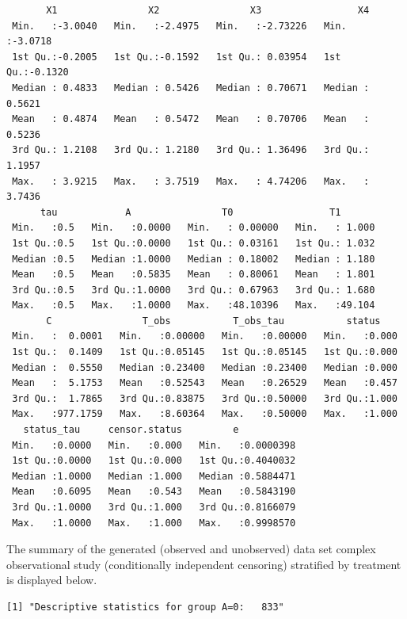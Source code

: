 \documentclass[
  11pt,
  a4paper,
]{article}
\theoremstyle{plain}
\theoremstyle{plain}
\theoremstyle{plain}
\theoremstyle{definition}
\theoremstyle{remark}
\begin{document}
\begin{verbatim}
       X1                X2                X3                 X4         
 Min.   :-3.0040   Min.   :-2.4975   Min.   :-2.73226   Min.   :-3.0718  
 1st Qu.:-0.2005   1st Qu.:-0.1592   1st Qu.: 0.03954   1st Qu.:-0.1320  
 Median : 0.4833   Median : 0.5426   Median : 0.70671   Median : 0.5621  
 Mean   : 0.4874   Mean   : 0.5472   Mean   : 0.70706   Mean   : 0.5236  
 3rd Qu.: 1.2108   3rd Qu.: 1.2180   3rd Qu.: 1.36496   3rd Qu.: 1.1957  
 Max.   : 3.9215   Max.   : 3.7519   Max.   : 4.74206   Max.   : 3.7436  
      tau            A                T0                 T1        
 Min.   :0.5   Min.   :0.0000   Min.   : 0.00000   Min.   : 1.000  
 1st Qu.:0.5   1st Qu.:0.0000   1st Qu.: 0.03161   1st Qu.: 1.032  
 Median :0.5   Median :1.0000   Median : 0.18002   Median : 1.180  
 Mean   :0.5   Mean   :0.5835   Mean   : 0.80061   Mean   : 1.801  
 3rd Qu.:0.5   3rd Qu.:1.0000   3rd Qu.: 0.67963   3rd Qu.: 1.680  
 Max.   :0.5   Max.   :1.0000   Max.   :48.10396   Max.   :49.104  
       C                T_obs           T_obs_tau           status     
 Min.   :  0.0001   Min.   :0.00000   Min.   :0.00000   Min.   :0.000  
 1st Qu.:  0.1409   1st Qu.:0.05145   1st Qu.:0.05145   1st Qu.:0.000  
 Median :  0.5550   Median :0.23400   Median :0.23400   Median :0.000  
 Mean   :  5.1753   Mean   :0.52543   Mean   :0.26529   Mean   :0.457  
 3rd Qu.:  1.7865   3rd Qu.:0.83875   3rd Qu.:0.50000   3rd Qu.:1.000  
 Max.   :977.1759   Max.   :8.60364   Max.   :0.50000   Max.   :1.000  
   status_tau     censor.status         e            
 Min.   :0.0000   Min.   :0.000   Min.   :0.0000398  
 1st Qu.:0.0000   1st Qu.:0.000   1st Qu.:0.4040032  
 Median :1.0000   Median :1.000   Median :0.5884471  
 Mean   :0.6095   Mean   :0.543   Mean   :0.5843190  
 3rd Qu.:1.0000   3rd Qu.:1.000   3rd Qu.:0.8166079  
 Max.   :1.0000   Max.   :1.000   Max.   :0.9998570  
\end{verbatim}

The summary of the generated (observed and unobserved) data set complex
observational study (conditionally independent censoring) stratified by
treatment is displayed below.

\begin{verbatim}
[1] "Descriptive statistics for group A=0:   833"
\end{verbatim}
\end{document}

